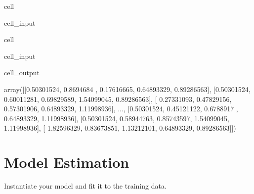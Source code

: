 \documentclass[letterpaper,10pt,english]{sphinxmanual}
\begin{document}
\begin{sphinxuseclass}{cell}
\begin{sphinxuseclass}{cell_input}
\begin{sphinxVerbatim}[commandchars=\\\{\}]
  
  
\end{sphinxVerbatim}

\end{sphinxuseclass}
\end{sphinxuseclass}
\begin{sphinxuseclass}{cell}
\begin{sphinxuseclass}{cell_input}
\begin{sphinxVerbatim}[commandchars=\\\{\}]
\end{sphinxVerbatim}

\end{sphinxuseclass}
\begin{sphinxuseclass}{cell_output}
\begin{sphinxVerbatim}[commandchars=\\\{\}]
array([[\PYGZhy{}0.50301524,  0.8694684 ,  0.17616665, \PYGZhy{}0.64893329,  0.89286563],
       [\PYGZhy{}0.50301524, \PYGZhy{}0.60011281, \PYGZhy{}0.69829589,  1.54099045,  0.89286563],
       [ 0.27331093, \PYGZhy{}0.47829156, \PYGZhy{}0.57301906, \PYGZhy{}0.64893329, \PYGZhy{}1.11998936],
       ...,
       [\PYGZhy{}0.50301524, \PYGZhy{}0.45121122, \PYGZhy{}0.6788917 , \PYGZhy{}0.64893329, \PYGZhy{}1.11998936],
       [\PYGZhy{}0.50301524, \PYGZhy{}0.58944763, \PYGZhy{}0.85743597,  1.54099045, \PYGZhy{}1.11998936],
       [ 1.82596329,  0.83673851,  1.13212101, \PYGZhy{}0.64893329,  0.89286563]])
\end{sphinxVerbatim}

\end{sphinxuseclass}
\end{sphinxuseclass}

\section{Model Estimation}
\label{\detokenize{Automatidata_Regression Analysis:model-estimation}}
\sphinxAtStartPar
Instantiate your model and fit it to the training data.
\end{document}
